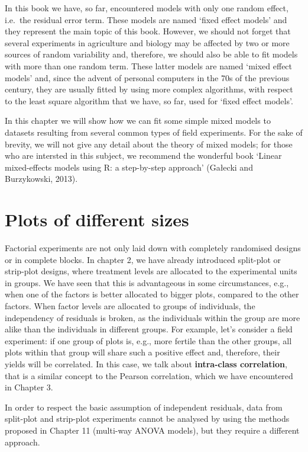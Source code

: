 \documentclass[a4paper,12pt,oneside]{book}
\begin{document}
In this book we have, so far, encountered models with only one random effect, i.e.~the residual error term. These models are named `fixed effect models' and they represent the main topic of this book. However, we should not forget that several experiments in agriculture and biology may be affected by two or more sources of random variability and, therefore, we should also be able to fit models with more than one random term. These latter models are named `mixed effect models' and, since the advent of personal computers in the 70s of the previous century, they are usually fitted by using more complex algorithms, with respect to the least square algorithm that we have, so far, used for `fixed effect models'.

In this chapter we will show how we can fit some simple mixed models to datasets resulting from several common types of field experiments. For the sake of brevity, we will not give any detail about the theory of mixed models; for those who are intersted in this subject, we recommend the wonderful book `Linear mixed-effects models using R: a step-by-step approach' (Gałecki and Burzykowski, 2013).

\hypertarget{plots-of-different-sizes}{%
\section{Plots of different sizes}\label{plots-of-different-sizes}}

Factorial experiments are not only laid down with completely randomised designs or in complete blocks. In chapter 2, we have already introduced split-plot or strip-plot designs, where treatment levels are allocated to the experimental units in groups. We have seen that this is advantageous in some circumstances, e.g., when one of the factors is better allocated to bigger plots, compared to the other factors. When factor levels are allocated to groups of individuals, the independency of residuals is broken, as the individuals within the group are more alike than the individuals in different groups. For example, let's consider a field experiment: if one group of plots is, e.g., more fertile than the other groups, all plots within that group will share such a positive effect and, therefore, their yields will be correlated. In this case, we talk about \textbf{intra-class correlation}, that is a similar concept to the Pearson correlation, which we have encountered in Chapter 3.

In order to respect the basic assumption of independent residuals, data from split-plot and strip-plot experiments cannot be analysed by using the methods proposed in Chapter 11 (multi-way ANOVA models), but they require a different approach.
\end{document}
